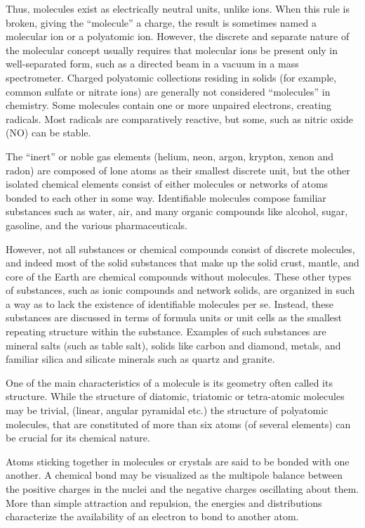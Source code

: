 Thus, molecules exist as electrically neutral units, unlike ions. When this rule is broken, giving the ``molecule'' a charge, the result is sometimes named a molecular ion or a polyatomic ion. However, the discrete and separate nature of the molecular concept usually requires that molecular ions be present only in well-separated form, such as a directed beam in a vacuum in a mass spectrometer. Charged polyatomic collections residing in solids (for example, common sulfate or nitrate ions) are generally not considered ``molecules'' in chemistry. Some molecules contain one or more unpaired electrons, creating radicals. Most radicals are comparatively reactive, but some, such as nitric oxide (NO) can be stable.

The ``inert'' or noble gas elements (helium, neon, argon, krypton, xenon and radon) are composed of lone atoms as their smallest discrete unit, but the other isolated chemical elements consist of either molecules or networks of atoms bonded to each other in some way. Identifiable molecules compose familiar substances such as water, air, and many organic compounds like alcohol, sugar, gasoline, and the various pharmaceuticals.

However, not all substances or chemical compounds consist of discrete molecules, and indeed most of the solid substances that make up the solid crust, mantle, and core of the Earth are chemical compounds without molecules. These other types of substances, such as ionic compounds and network solids, are organized in such a way as to lack the existence of identifiable molecules per se. Instead, these substances are discussed in terms of formula units or unit cells as the smallest repeating structure within the substance. Examples of such substances are mineral salts (such as table salt), solids like carbon and diamond, metals, and familiar silica and silicate minerals such as quartz and granite.

One of the main characteristics of a molecule is its geometry often called its structure. While the structure of diatomic, triatomic or tetra-atomic molecules may be trivial, (linear, angular pyramidal etc.) the structure of polyatomic molecules, that are constituted of more than six atoms (of several elements) can be crucial for its chemical nature.

Atoms sticking together in molecules or crystals are said to be bonded with one another. A chemical bond may be visualized as the multipole balance between the positive charges in the nuclei and the negative charges oscillating about them. More than simple attraction and repulsion, the energies and distributions characterize the availability of an electron to bond to another atom.

